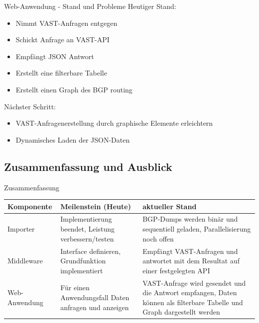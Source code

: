 \documentclass[9pt]{beamer}
\begin{document}
\begin{frame}{Web-Anwendung - Stand und Probleme}
	Heutiger Stand:
	\begin{itemize}
		\item Nimmt VAST-Anfragen entgegen 
		\item Schickt Anfrage an VAST-API
		\item Empfängt JSON Antwort 
		\item Erstellt eine filterbare Tabelle
		\item Erstellt einen Graph des BGP routing
	\end{itemize}
	Nächster Schritt:
	\begin{itemize}
		\item VAST-Anfragenerstellung durch graphische Elemente erleichtern
		\item Dynamisches Laden der JSON-Daten
	\end{itemize}
\end{frame}

\subsection{Zusammenfassung und Ausblick}

\begin{frame}{Zusammenfassung}

	\begin{table}[h!]
	\centering
	\begin{tabular}{p{5em} p{12em} p{12em}}
		\textbf{Komponente} & \textbf{Meilenstein (Heute)} & \textbf{aktueller Stand} \\ \midrule
		Importer & Implementierung beendet, Leistung verbessern/testen & BGP-Dumps werden binär und sequentiell geladen, Parallelisierung noch offen \\ \midrule
		Middleware & Interface definieren, Grundfunktion implementiert & Empfängt VAST-Anfragen und antwortet mit dem Resultat auf einer festgelegten API \\ \midrule
		Web-Anwendung & Für einen Anwendungsfall Daten anfragen und anzeigen & VAST-Anfrage wird gesendet und die Antwort empfangen, Daten können als filterbare Tabelle und Graph dargestellt werden \\ \bottomrule
	\end{tabular}
	\end{table}
\end{frame}
\end{document}
